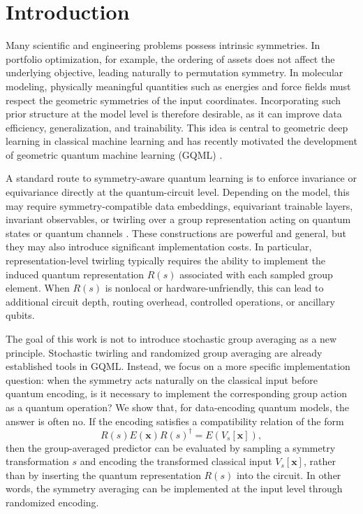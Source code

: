 \documentclass[%
 reprint,
 amsmath,amssymb,
 aps,
 pra,
]{revtex4-2}
\theoremstyle{definition}
\begin{document}
\maketitle

\section{Introduction}

Many scientific and engineering problems possess intrinsic symmetries. In portfolio optimization, for example, the ordering of assets does not affect the underlying objective, leading naturally to permutation symmetry. In molecular modeling, physically meaningful quantities such as energies and force fields must respect the geometric symmetries of the input coordinates. Incorporating such prior structure at the model level is therefore desirable, as it can improve data efficiency, generalization, and trainability. This idea is central to geometric deep learning in classical machine learning and has recently motivated the development of geometric quantum machine learning (GQML) \cite{Larocca2022,Meyer2023,Michael2023,Cenk2024,Louis2024,Nguyen2024,West2024,Sauvage2024,nha2025,Das2025}.

A standard route to symmetry-aware quantum learning is to enforce invariance or equivariance directly at the quantum-circuit level. Depending on the model, this may require symmetry-compatible data embeddings, equivariant trainable layers, invariant observables, or twirling over a group representation acting on quantum states or quantum channels \cite{Larocca2022,Meyer2023,Nguyen2024}. These constructions are powerful and general, but they may also introduce significant implementation costs. In particular, representation-level twirling typically requires the ability to implement the induced quantum representation \(R(s)\) associated with each sampled group element. When \(R(s)\) is nonlocal or hardware-unfriendly, this can lead to additional circuit depth, routing overhead, controlled operations, or ancillary qubits.

The goal of this work is not to introduce stochastic group averaging as a new principle. Stochastic twirling and randomized group averaging are already established tools in GQML. Instead, we focus on a more specific implementation question: when the symmetry acts naturally on the classical input before quantum encoding, is it necessary to implement the corresponding group action as a quantum operation? We show that, for data-encoding quantum models, the answer is often no. If the encoding satisfies a compatibility relation of the form
\begin{equation}
R(s) E(\bm{x}) R(s)^\dagger = E(V_s[\bm{x}]),
\end{equation}
then the group-averaged predictor can be evaluated by sampling a symmetry transformation \(s\) and encoding the transformed classical input \(V_s[\bm{x}]\), rather than by inserting the quantum representation \(R(s)\) into the circuit. In other words, the symmetry averaging can be implemented at the input level through randomized encoding.
\end{document}
